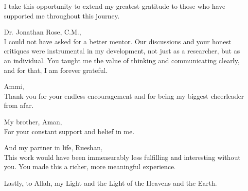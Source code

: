 \noindent I take this opportunity to extend my greatest gratitude to those who have supported me throughout this journey.

\noindent Dr. Jonathan Rose, C.M.,\\
\indent I could not have asked for a better mentor. Our discussions and your honest critiques were instrumental in my development, not just as a researcher, but as an individual. You taught me the value of thinking and communicating clearly, and for that, I am forever grateful.

\noindent Ammi,\\
\indent Thank you for your endless encouragement and for being my biggest cheerleader from afar.

\noindent My brother, Aman,\\
\indent For your constant support and belief in me.

\noindent And my partner in life, Rueshan,\\
\indent This work would have been immeasurably less fulfilling and interesting without you. You made this a richer, more meaningful experience.

\noindent Lastly, to Allah, my Light and the Light of the Heavens and the Earth.
